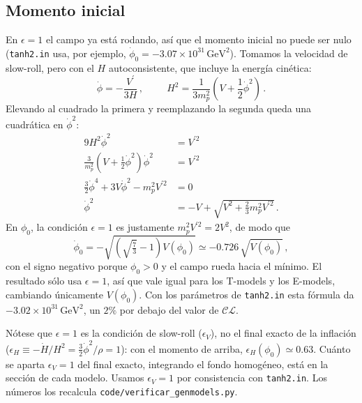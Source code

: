 \documentclass[11pt]{article}
\newcommand{\CosmoLattice}{\ensuremath{\mathcal{C}}\text{osmo}\ensuremath{\mathcal{L}}\text{attice}\xspace}
\begin{document}
        \subsection{Momento inicial}
            \label{sec:momento-inicial}

            En $\epsilon = 1$ el campo ya está rodando, así que el momento inicial no puede ser nulo (\texttt{tanh2.in} usa, por ejemplo, $\dot\phi_0 = -3.07 \times 10^{31}\,\text{GeV}^2$). Tomamos la velocidad de slow-roll, pero con el $H$ autoconsistente, que incluye la energía cinética:
            \begin{equation}
                \dot{\phi} = -\frac{V^\prime}{3H} \, ,
                \hspace{1cm}
                H^2 = \frac{1}{3 m_p^2} \left( V + \frac{1}{2} \dot{\phi}^2 \right) \, .
            \end{equation}
            Elevando al cuadrado la primera y reemplazando la segunda queda una cuadrática en $\dot\phi^2$:
            \begin{equation*}
                \begin{split}
                    9 H^2 \dot{\phi}^2 &= V^{\prime 2}\\
                    \frac{3}{m_p^2} \left( V + \frac{1}{2} \dot{\phi}^2 \right) \dot{\phi}^2 &= V^{\prime 2}\\
                    \frac{3}{2} \dot{\phi}^4 + 3 V \dot{\phi}^2 - m_p^2 V^{\prime 2} &= 0\\
                    \dot{\phi}^2 &= -V + \sqrt{V^2 + \frac{2}{3} m_p^2 V^{\prime 2}} \, .
                \end{split}
            \end{equation*}
            En $\phi_0$, la condición $\epsilon = 1$ es justamente $m_p^2 V^{\prime 2} = 2 V^2$, de modo que
            \begin{equation}
                \dot{\phi}_0 = - \sqrt{ \left( \sqrt{\tfrac{7}{3}} - 1 \right) V(\phi_0) } \simeq -0.726 \, \sqrt{V(\phi_0)} \, ,
            \end{equation}
            con el signo negativo porque $\phi_0 > 0$ y el campo rueda hacia el mínimo. El resultado sólo usa $\epsilon = 1$, así que vale igual para los T-models y los E-models, cambiando únicamente $V(\phi_0)$. Con los parámetros de \texttt{tanh2.in} esta fórmula da $-3.02 \times 10^{31}\,\text{GeV}^2$, un $2\%$ por debajo del valor de \CosmoLattice.

            Nótese que $\epsilon = 1$ es la condición de slow-roll ($\epsilon_V$), no el final exacto de la inflación ($\epsilon_H \equiv -\dot H/H^2 = \frac{3}{2}\dot\phi^2/\rho = 1$): con el momento de arriba, $\epsilon_H(\phi_0) \simeq 0.63$. Cuánto se aparta $\epsilon_V = 1$ del final exacto, integrando el fondo homogéneo, está en la sección de cada modelo. Usamos $\epsilon_V = 1$ por consistencia con \texttt{tanh2.in}. Los números los recalcula \texttt{code/verificar\_genmodels.py}.
\end{document}
